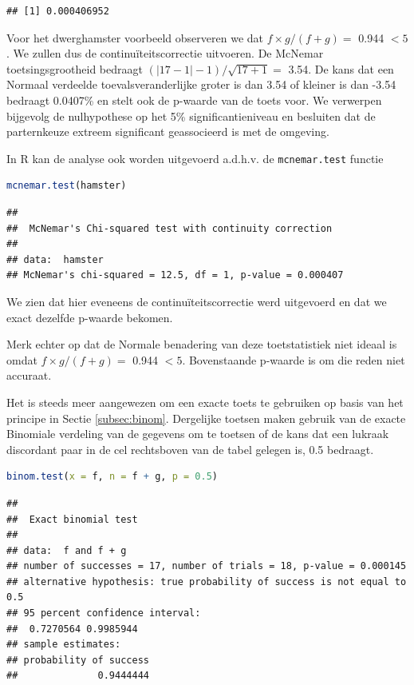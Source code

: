 \documentclass[
  12pt,dutch,coursenotes]{book}
\newcommand{\passthrough}[1]{#1}
\theoremstyle{definition}
\theoremstyle{definition}
\theoremstyle{definition}
\theoremstyle{definition}
\theoremstyle{remark}
\begin{document}
\begin{lstlisting}
## [1] 0.000406952
\end{lstlisting}

Voor het dwerghamster voorbeeld observeren we dat
\(f\times g/(f+g)=\) 0.944 \(<5\).
We zullen dus de continuïteitscorrectie uitvoeren.
De McNemar toetsingsgrootheid bedraagt
\((\vert 17-1 \vert -1)/\sqrt{17+1}=\) 3.54.
De kans dat een Normaal verdeelde toevalsveranderlijke groter is
dan 3.54 of kleiner is dan -3.54 bedraagt 0.0407\% en stelt ook de p-waarde van
de toets voor. We verwerpen bijgevolg de nulhypothese op het 5\% significantieniveau en
besluiten dat de parternkeuze extreem significant geassocieerd is met de omgeving.

In R kan de analyse ook worden uitgevoerd a.d.h.v. de \passthrough{\lstinline!mcnemar.test!} functie

\begin{lstlisting}[language=R]
mcnemar.test(hamster)
\end{lstlisting}

\begin{lstlisting}
## 
##  McNemar's Chi-squared test with continuity correction
## 
## data:  hamster
## McNemar's chi-squared = 12.5, df = 1, p-value = 0.000407
\end{lstlisting}

We zien dat hier eveneens de continuïteitscorrectie werd uitgevoerd en dat we exact dezelfde p-waarde bekomen.

Merk echter op dat de Normale benadering van deze toetstatistiek niet ideaal
is omdat \(f \times g/(f+g)=\) 0.944 \(<5\).
Bovenstaande p-waarde is om die reden niet accuraat.

Het is steeds meer aangewezen om een exacte toets te gebruiken op
basis van het principe in Sectie \ref{subsec:binom}.
Dergelijke toetsen maken
gebruik van de exacte Binomiale verdeling van de gegevens om te toetsen of
de kans dat een lukraak discordant paar in de cel rechtsboven van de tabel
gelegen is, 0.5 bedraagt.

\begin{lstlisting}[language=R]
binom.test(x = f, n = f + g, p = 0.5)
\end{lstlisting}

\begin{lstlisting}
## 
##  Exact binomial test
## 
## data:  f and f + g
## number of successes = 17, number of trials = 18, p-value = 0.000145
## alternative hypothesis: true probability of success is not equal to 0.5
## 95 percent confidence interval:
##  0.7270564 0.9985944
## sample estimates:
## probability of success 
##              0.9444444
\end{lstlisting}
\end{document}
